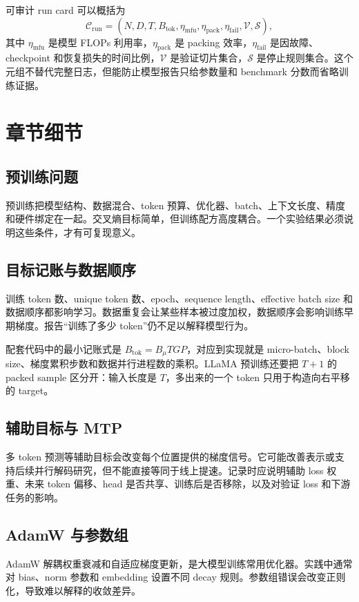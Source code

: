 \documentclass[UTF8,zihao=-4,openany]{ctexbook}
\begin{document}
可审计 run card 可以概括为
\[
  \mathcal{C}_{\mathrm{run}}
  =
  (N,D,T,B_{\mathrm{tok}},\eta_{\mathrm{mfu}},\eta_{\mathrm{pack}},
  \eta_{\mathrm{fail}},\mathcal{V},\mathcal{S}),
\]
其中 $\eta_{\mathrm{mfu}}$ 是模型 FLOPs 利用率，$\eta_{\mathrm{pack}}$ 是 packing 效率，$\eta_{\mathrm{fail}}$ 是因故障、checkpoint 和恢复损失的时间比例，$\mathcal{V}$ 是验证切片集合，$\mathcal{S}$ 是停止规则集合。这个元组不替代完整日志，但能防止模型报告只给参数量和 benchmark 分数而省略训练证据。

\section{章节细节}
\subsection{预训练问题}
预训练把模型结构、数据混合、token 预算、优化器、batch、上下文长度、精度和硬件绑定在一起。交叉熵目标简单，但训练配方高度耦合。一个实验结果必须说明这些条件，才有可复现意义。

\subsection{目标记账与数据顺序}
训练 token 数、unique token 数、epoch、sequence length、effective batch size 和数据顺序都影响学习。数据重复会让某些样本被过度加权，数据顺序会影响训练早期梯度。报告“训练了多少 token”仍不足以解释模型行为。

配套代码中的最小记账式是 $B_{\mathrm{tok}}=B_{\mu}TGP$，对应到实现就是 micro-batch、block size、梯度累积步数和数据并行进程数的乘积。LLaMA 预训练还要把 $T+1$ 的 packed sample 区分开：输入长度是 $T$，多出来的一个 token 只用于构造向右平移的 target。

\subsection{辅助目标与 MTP}
多 token 预测等辅助目标会改变每个位置提供的梯度信号。它可能改善表示或支持后续并行解码研究，但不能直接等同于线上提速。记录时应说明辅助 loss 权重、未来 token 偏移、head 是否共享、训练后是否移除，以及对验证 loss 和下游任务的影响。

\subsection{AdamW 与参数组}
AdamW 解耦权重衰减和自适应梯度更新，是大模型训练常用优化器。实践中通常对 bias、norm 参数和 embedding 设置不同 decay 规则。参数组错误会改变正则化，导致难以解释的收敛差异。
\end{document}
